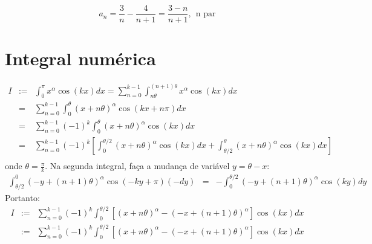 \documentclass[10pt,a4paper]{article}%
\begin{document}
$$a_n=\frac{3}{n}-\frac{4}{n+1} = \frac{3-n}{n+1}  , ~~\text{n par}$$

\newpage
\section{Integral numérica}
\begin{eqnarray*}
    I&:=&\int_0^\pi x^{\alpha}\cos(kx)dx =\sum_{n=0}^{k-1}\int_{n\theta}^{(n+1)\theta} x^{\alpha}\cos(kx)dx\\
      &=&\sum_{n=0}^{k-1}\int_{0}^{\theta} (x+n\theta)^{\alpha}\cos(kx + n\pi)dx\\
      &=&\sum_{n=0}^{k-1}(-1)^k\int_{0}^{\theta} (x+n\theta)^{\alpha}\cos(kx)dx\\
      &=&\sum_{n=0}^{k-1}(-1)^k\left[\int_{0}^{\theta/2} (x+n\theta)^{\alpha}\cos(kx)dx+ \int_{\theta/2}^{\theta} (x+n\theta)^{\alpha}\cos(kx)dx\right]\\
\end{eqnarray*}
onde $\theta = \frac{\pi}{k}$.
Na segunda integral, faça a mudança de variável $y= \theta - x$:
\begin{eqnarray*}
    \int_{\theta/2}^{0} (-y+(n+1)\theta)^{\alpha}\cos(-ky+\pi)(-dy) &=& -\int_0^{\theta/2} (-y+(n+1)\theta)^{\alpha}\cos(ky)dy
\end{eqnarray*}
Portanto:
\begin{eqnarray*}
    I&:=&\sum_{n=0}^{k-1}(-1)^k\int_{0}^{\theta/2}\left[ (x+n\theta)^{\alpha} - (-x + (n+1)\theta)^{\alpha}\right]\cos(kx)dx\\
    &:=& \sum_{n=0}^{k-1}(-1)^k\int_{0}^{\theta/2}\left[ (x+n\theta)^{\alpha} - (-x + (n+1)\theta)^{\alpha}\right]\cos(kx)dx
\end{eqnarray*}
\end{document}
